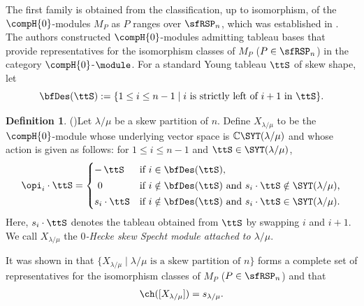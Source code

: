 \documentclass[12pt, reqno]{amsart}
\theoremstyle{plain}
\theoremstyle{definition}
\newtheorem{definition}[definition]{Definition}
\numberwithin{equation}{section}
\numberwithin{figure}{section}
\numberwithin{table}{section}
\def\C{\mathbb C}
\begin{document}
The first family is obtained from the classification, up to isomorphism, of the $\compH{0}$-modules $M_P$ as $P$ ranges over $\sfRSP_n$, which was established in \cite[Theorem 5.5]{23KLO}. 
The authors constructed $\compH{0}$-modules admitting tableau bases that provide representatives for the isomorphism classes of $M_P$ ($P \in \sfRSP_n$) in the category $\compH{0}$-$\module$.
For a standard Young tableau $\ttS$ of skew shape, let 
\[
\bfDes(\ttS) := \{1 \leq i \leq n-1 \mid \text{$i$ is strictly left of $i+1$ in $\ttS$} \}.
\]
\begin{definition}{\rm (\cite[Appendix A]{23KLO})}\label{def: def of X lam mu} 
Let $\lambda/\mu$ be a skew partition of  $n$.
Define $X_{\lambda/\mu}$ to be the $\compH{0}$-module whose underlying vector space is $\C\SYT(\lambda/\mu)$ and whose action is given as follows: for $1 \leq i \leq n-1$ and $\ttS \in \SYT(\lambda/\mu)$,
\begin{align}\label{eq: left action for X}
\opi_i \cdot \ttS =
\begin{cases}
-\,\ttS
& \text{if $i \in \bfDes(\ttS)$,}\\[2pt]
~0
& \text{if $i \notin \bfDes(\ttS)$ and $s_i \cdot \ttS \notin \SYT(\lambda/\mu)$,}\\[2pt]
s_i \cdot \ttS
& \text{if $i \notin \bfDes(\ttS)$ and $s_i \cdot \ttS \in \SYT(\lambda/\mu)$.}
\end{cases}
\end{align} 
Here, $s_i \cdot \ttS$ denotes the tableau obtained from $\ttS$ by swapping $i$ and $i+1$.   
We call $X_{\lambda/\mu}$ the \emph{$0$-Hecke skew Specht module attached to $\lambda/\mu$}.
\end{definition}



It was shown in \cite{23KLO} that   $\{X_{\lambda/\mu} \mid \lambda/\mu \text{ is a skew partition of } n\}$ forms a complete set of representatives for the isomorphism classes of $M_P$ ($P \in \sfRSP_n$) and that
\begin{align}\label{eq: ch of X}
\ch([X_{\lambda/\mu}]) = s_{\lambda/\mu}.
\end{align}
\end{document}
